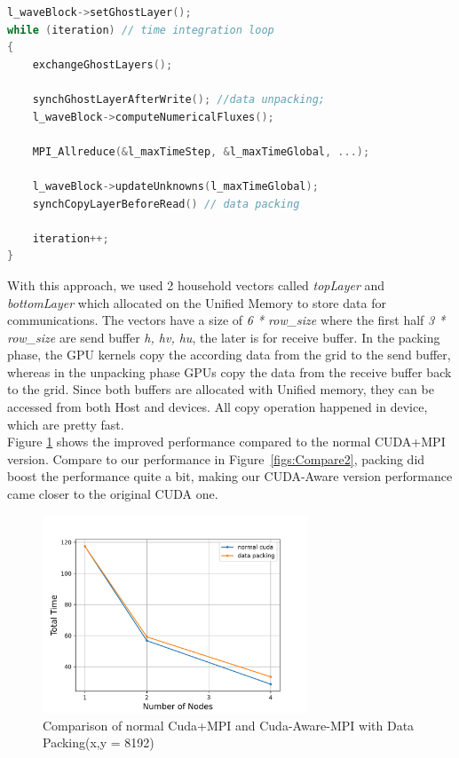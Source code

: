 \documentclass[article]{scrartcl}
\begin{document}
\begin{lstlisting}[frame=single,language=c++, captionpos=b, label={profile3}]
l_waveBlock->setGhostLayer();
while (iteration) // time integration loop
{
	exchangeGhostLayers();
	
	synchGhostLayerAfterWrite(); //data unpacking;
	l_waveBlock->computeNumericalFluxes();
	
	MPI_Allreduce(&l_maxTimeStep, &l_maxTimeGlobal, ...);
	
	l_waveBlock->updateUnknowns(l_maxTimeGlobal);
	synchCopyLayerBeforeRead() // data packing
	
	iteration++;
}
\end{lstlisting}
With this approach, we used 2 household vectors called \textit{topLayer} and \textit{bottomLayer} which allocated on the Unified Memory to store data for communications. The vectors have a size of \textit{6 * row\_size} where the first half \textit{3 * row\_size} are send buffer \textit{h, hv, hu}, the later is for receive buffer. In the packing phase, the GPU kernels copy the according data from the grid to the send buffer, whereas in the unpacking phase GPUs copy the data from the receive buffer back to the grid. Since both buffers are allocated with Unified memory, they can be accessed from both Host and devices. All copy operation happened in device, which are pretty fast. \\
Figure \ref{fig:CompareCudaPacking} shows the improved performance compared to the normal CUDA+MPI version. Compare to our performance in Figure~\ref{figs:Compare2}, packing did boost the performance quite a bit, making our CUDA-Aware version performance came closer to the original CUDA one.
\begin{figure}[htpb]
	\centering
	\includegraphics[width=0.7\textwidth,keepaspectratio=true]{../figs/Comparison_CUDA_PACKING.png}
	\caption{Comparison of normal Cuda+MPI and Cuda-Aware-MPI with Data Packing(x,y = 8192) }
	\label{fig:CompareCudaPacking}
\end{figure}
\end{document}

